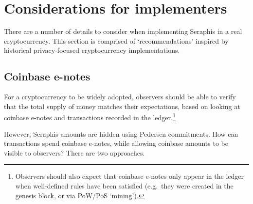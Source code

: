 \section{Considerations for implementers}
\label{sec:considerations-implementers}

There are a number of details to consider when implementing Seraphis in a real cryptocurrency. This section is comprised of `recommendations' inspired by historical privacy-focused cryptocurrency implementations.


\subsection{Coinbase e-notes}
\label{subsec:implementers-coinbase-enotes}

For a cryptocurrency to be widely adopted, observers should be able to verify that the total supply of money matches their expectations, based on looking at coinbase e-notes and transactions recorded in the ledger.\footnote{Observers should also expect that coinbase e-notes only appear in the ledger when well-defined rules have been satisfied (e.g.\ they were created in the genesis block, or via PoW/PoS `mining').}

However, Seraphis amounts are hidden using Pedersen commitments. How can transactions spend coinbase e-notes, while allowing coinbase amounts to be visible to observers? There are two approaches.

